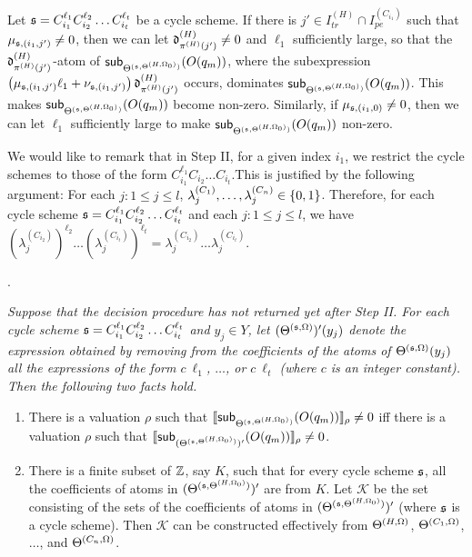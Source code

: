 \medskip

Let $\schm=C_{i_1}^{\ell_1} C_{i_2}^{\ell_2} \dots C_{i_t}^{\ell_t}$ be a cycle scheme. If there is $j' \in I^{(H)}_{tr} \cap I^{(C_{i_1})}_{pe}$ such that $\mu_{\schm,(i_1,j')} \neq 0$, then we can let $\vard^{(H)}_{\pi^{(H)}(j')} \neq 0$ and $\ell_1$ sufficiently large, so that the $\vard^{(H)}_{\pi^{(H)}(j')}$-atom of $\sub{O(q_m)}{\sumf^{(\schm,\sumf^{(H,\initval_0)})}}$, where the subexpression $\left(\mu_{\schm, (i_1,j')} \ell_1 + \nu_{\schm, (i_1,j')} \right)\vard^{(H)}_{\pi^{(H)}(j')}$ occurs, dominates $\sub{O(q_m)}{\sumf^{(\schm,\sumf^{(H,\initval_0)})}}$. This makes $\sub{O(q_m)}{\sumf^{(\schm,\sumf^{(H,\initval_0)})}}$ become non-zero. Similarly, if $\mu_{\schm,(i_1,0)} \neq 0$, then we can let $\ell_1$ sufficiently large to make $\sub{O(q_m)}{\sumf^{(\schm,\sumf^{(H,\initval_0)})}}$ non-zero.

\smallskip

We would like to remark that in Step II, for a given index $i_1$, we restrict the cycle schemes to those of the form $C_{i_1}^{\ell_1} C_{i_2} \dots C_{i_t}$.This is justified by the following argument: For each $j: 1 \le j \le l$, $\cstl^{(C_{1})}_j, \dots, \cstl^{(C_{n})}_j \in \{0,1\}$. Therefore, for each cycle scheme $\schm=C_{i_1}^{\ell_1} C_{i_2}^{\ell_2} \dots C_{i_t}^{\ell_t}$ and each $j: 1 \le j \le l$,  we have $(\lambda^{(C_{i_2})}_{j})^{\ell_2} \dots (\lambda^{(C_{i_t})}_{j})^{\ell_t} = \lambda^{(C_{i_2})}_{j} \dots \lambda^{(C_{i_t})}_{j}$.


\medskip

. 
{\it 
Suppose that the decision procedure has not returned yet after Step II. For each cycle scheme $\schm=C_{i_1}^{\ell_1} C_{i_2}^{\ell_2} \dots C_{i_t}^{\ell_t}$ and $y_j \in Y$, let $(\sumf^{(\schm,\initval)})'(y_j)$ denote the expression obtained by removing from the coefficients of the atoms of $\sumf^{(\schm,\initval)}(y_j)$ all the expressions of the form $c\ \ell_1$, $\dots$, or $c\ \ell_t$ (where $c$ is an integer constant).  Then the following two facts hold.
\begin{enumerate}
\item There is a valuation $\rho$ such that $\eval{\sub{O(q_m)}{\sumf^{(\schm, \sumf^{(H,\initval_0)})}}}{\rho}\neq 0$ iff there is a valuation $\rho$ such that $\eval{\sub{O(q_m)}{(\sumf^{(\schm, \sumf^{(H,\initval_0)})})'}}{\rho} \neq 0$.
%
\item There is a finite subset of $\intnum$, say $K$, such that for every cycle scheme $\schm$, all the coefficients of atoms in $(\sumf^{(\schm, \sumf^{(H,\initval_0)})})'$ are from $K$. Let $\mathcal{K}$ be the set consisting of the sets of the coefficients of atoms in  $(\sumf^{(\schm, \sumf^{(H,\initval_0)})})'$ (where $\schm$ is a cycle scheme). Then $\mathcal{K}$ can be constructed effectively from $\sumf^{(H,\initval)}$, $\sumf^{(C_1,\initval)}$, $\dots$, and $\sumf^{(C_n,\initval)}$.
\end{enumerate}
}

